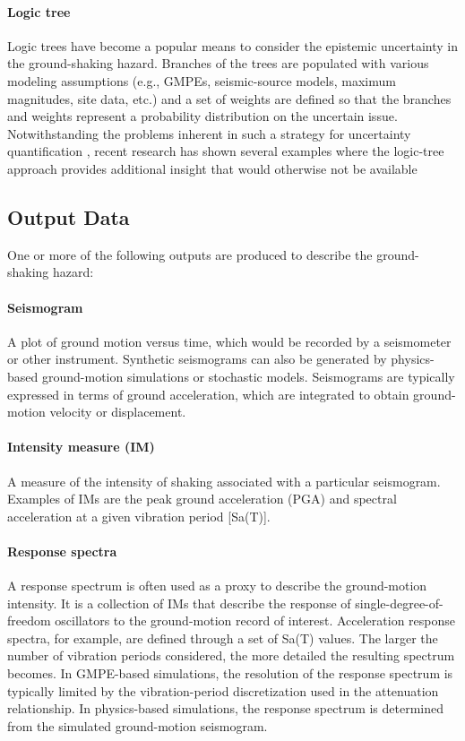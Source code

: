 \paragraph{Logic tree} Logic trees have become a popular means to consider the epistemic uncertainty in the ground-shaking hazard. Branches of the trees are populated with various modeling assumptions (e.g., GMPEs, seismic-source models, maximum magnitudes, site data, etc.) and a set of weights are defined so that the branches and weights represent a probability distribution on the uncertain issue. Notwithstanding the problems inherent in such a strategy for uncertainty quantification \citep{bommer2008use}, recent research has shown several examples where the logic-tree approach provides additional insight that would otherwise not be available \citep[see e.g.,][]{goulet2017ngaeast}

\subsection{Output Data}

\noindent One or more of the following outputs are produced to describe the ground-shaking hazard:

\paragraph{Seismogram} A plot of ground motion versus time, which would be recorded by a seismometer or other instrument. Synthetic seismograms can also be generated by physics-based ground-motion simulations or stochastic models. Seismograms are typically expressed in terms of ground acceleration, which are integrated to obtain ground-motion velocity or displacement. 

\paragraph{Intensity measure (IM)} A measure of the intensity of shaking associated with a particular seismogram. Examples of IMs are the peak ground acceleration (PGA) and spectral acceleration at a given vibration period [Sa(T)].

\paragraph{Response spectra} A response spectrum is often used as a proxy to describe the ground-motion intensity. It is a collection of IMs that describe the response of single-degree-of-freedom oscillators to the ground-motion record of interest. Acceleration response spectra, for example, are defined through a set of Sa(T) values. The larger the number of vibration periods considered, the more detailed the resulting spectrum becomes. In GMPE-based simulations, the resolution of the response spectrum is typically limited by the vibration-period discretization used in the attenuation relationship. In physics-based simulations, the response spectrum is determined from the simulated ground-motion seismogram.

